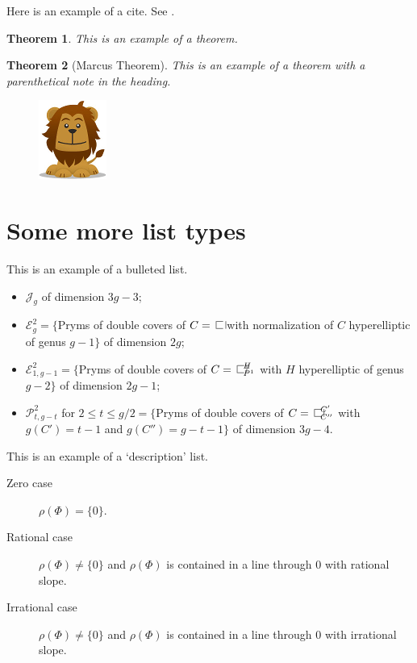 \documentclass{amsart}
\newtheorem{theorem}{Theorem}[section]
\theoremstyle{definition}
\theoremstyle{remark}
\numberwithin{equation}{section}
\newcommand{\blankbox}[2]{%
  \parbox{\columnwidth}{\centering
    \setlength{\fboxsep}{0pt}%
    \fbox{\raisebox{0pt}[#2]{\hspace{#1}}}%
  }%
}
\begin{document}
Here is an example of a cite. See \cite{A}.

\begin{theorem}
This is an example of a theorem.
\end{theorem}

\begin{theorem}[Marcus Theorem]
This is an example of a theorem with a parenthetical note in the
heading.
\end{theorem}



\begin{figure}[tb]
\includegraphics{lion.png}
\caption{}\label{otherfig}
\end{figure}

\section{Some more list types}
This is an example of a bulleted list.

\begin{itemize}
\item $\mathcal{J}_g$ of dimension $3g-3$;
\item $\mathcal{E}^2_g=\{$Pryms of double covers of $C=\openbox$ with
normalization of $C$ hyperelliptic of genus $g-1\}$ of dimension $2g$;
\item $\mathcal{E}^2_{1,g-1}=\{$Pryms of double covers of
$C=\openbox^H_{P^1}$ with $H$ hyperelliptic of genus $g-2\}$ of
dimension $2g-1$;
\item $\mathcal{P}^2_{t,g-t}$ for $2\le t\le g/2=\{$Pryms of double
covers of $C=\openbox^{C'}_{C''}$ with $g(C')=t-1$ and $g(C'')=g-t-1\}$
of dimension $3g-4$.
\end{itemize}

This is an example of a `description' list.

\begin{description}
\item[Zero case] $\rho(\Phi) = \{0\}$.

\item[Rational case] $\rho(\Phi) \ne \{0\}$ and $\rho(\Phi)$ is
contained in a line through $0$ with rational slope.

\item[Irrational case] $\rho(\Phi) \ne \{0\}$ and $\rho(\Phi)$ is
contained in a line through $0$ with irrational slope.
\end{description}
\end{document}
